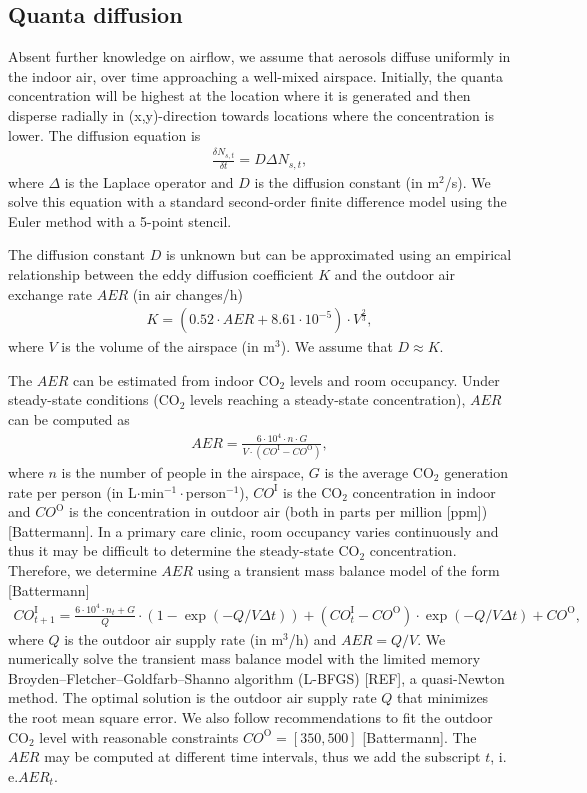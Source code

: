 \documentclass[fleqn,11pt]{wlscirep_supp}
\newcommand\ie{i.\,e.\xspace}
\begin{document}
\subsection{Quanta diffusion}\label{sec:quanta-diffusion}

Absent further knowledge on airflow, we assume that aerosols diffuse uniformly in the indoor air, over time approaching a well-mixed airspace. Initially, the quanta concentration will be highest at the location where it is generated and then disperse radially in (x,y)-direction towards locations where the concentration is lower. The diffusion equation is 
\begin{align}\label{eq:diffusion}
    \frac{\delta N_{s,t}}{\delta t} = D \Delta N_{s,t},
\end{align}
where $\Delta$ is the Laplace operator and $D$ is the diffusion constant (in m$^2$/s). We solve this equation with a standard second-order finite difference model using the Euler method with a 5-point stencil. 

The diffusion constant $D$ is unknown but can be approximated using an empirical relationship between the eddy diffusion coefficient $K$ and the outdoor air exchange rate $AER$ (in air changes/h)
\begin{align}
    K = (0.52 \cdot AER + 8.61\cdot10^{-5}) \cdot V^{\frac{2}{3}},
\end{align}
where $V$ is the volume of the airspace (in m$^3$). We assume that $D \approx K$. 

The $AER$ can be estimated from indoor CO$_2$ levels and room occupancy. Under steady-state conditions (CO$_2$ levels reaching a steady-state concentration), $AER$ can be computed as
\begin{align}
    AER = \frac{6\cdot10^4 \cdot n \cdot G}{V\cdot(CO^{\text{I}}-CO^{\text{O}})},
\end{align}
where $n$ is the number of people in the airspace, $G$ is the average CO$_2$ generation rate per person (in L$\cdot$min$^{-1}\cdot$person$^{-1}$), $CO^{\text{I}}$ is the CO$_2$ concentration in indoor and $CO^{\text{O}}$ is the concentration in outdoor air (both in parts per million [ppm]) [Battermann]. In a primary care clinic, room occupancy varies continuously and thus it may be difficult to determine the steady-state CO$_2$ concentration. Therefore, we determine $AER$ using a transient mass balance model of the form [Battermann]
\begin{align}
    CO_{t+1}^{\text{I}} = \frac{6\cdot10^4 \cdot n_t + G}{Q} \cdot \left(1 - \exp(-Q/V \Delta t)\right) + (CO_t^{\text{I}}-CO^{\text{O}}) \cdot \exp(-Q/V \Delta t) + CO^{\text{O}},
\end{align}
where $Q$ is the outdoor air supply rate (in m$^3$/h) and $AER = Q/V$. We numerically solve the transient mass balance model with the limited memory Broyden–Fletcher–Goldfarb–Shanno algorithm (L-BFGS) [REF], a quasi-Newton method. The optimal solution is the outdoor air supply rate $Q$ that minimizes the root mean square error. We also follow recommendations to fit the outdoor CO$_2$ level with reasonable constraints $CO^{\text{O}} = [350,500]$ [Battermann]. The $AER$ may be computed at different time intervals, thus we add the subscript $t$, \ie $AER_t$.
\end{document}
